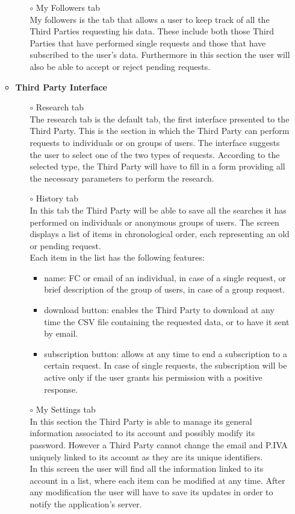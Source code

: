 \documentclass[titlepage]{article}
\begin{document}
\begin{itemize}
\begin{itemize}
\begin{itemize}
					\item[$\circ$] My Followers tab \\
				My followers is the tab that allows a user to keep track of all the Third Parties requesting his data. These include both those Third Parties that have performed single requests and those that have subscribed to the user’s data. Furthermore in this section the user will also be able to accept or reject pending requests.

				\end{itemize}
			
				\item{\bf Third Party Interface}
				\begin{itemize}
					\item[$\circ$] Research tab \\
				The research tab is the default tab, the first interface presented to the Third Party. This is the section in which the Third Party can perform requests to individuals or on groups of users. The interface suggests the user to select one of the two types of requests. According to the selected type, the Third Party will have to fill in a form providing all the necessary parameters to perform the research.
					\item[$\circ$] History tab\\
				In this tab the Third Party will be able to save all the searches it has performed on individuals or anonymous groups of users. The screen displays a list of items in chronological order, each representing an old or pending request.\\
Each item in the list has the following features:
						\begin{itemize}
							\item name: FC or email of an individual, in case of a single request, or brief description of the group of users, in case of a group request.
							\item download button: enables the Third Party to download at any time the CSV file containing the requested data, or to have it sent by email.
							\item subscription button: allows at any time to end a subscription to a certain request. In case of single requests, the subscription will be active only if the user grants his permission with a positive response.
						\end{itemize}
						

					\item[$\circ$] My Settings tab \\
				In this section the Third Party is able to manage its general information associated to its account and possibly modify its password. However a Third Party cannot change the email and P.IVA uniquely linked to its account as they are its unique identifiers.\\
In this screen the user will find all the information linked to its account in a list, where each item can be modified at any time. After any modification the user will have to save its updates in order to notify the application’s server.


\end{itemize}
\end{itemize}
\end{itemize}
\end{document}
